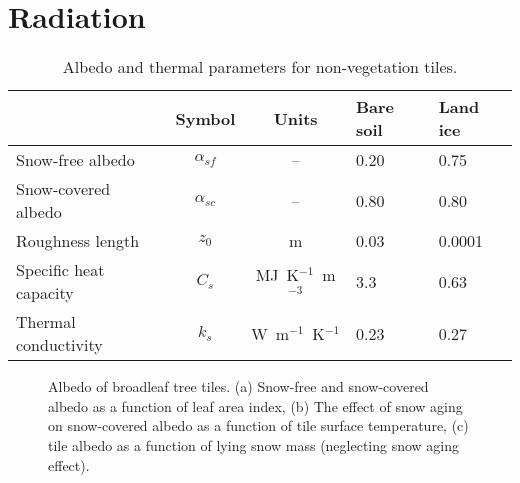 \documentclass[a4paper]{article}
\begin{document}
\section{Radiation}\label{s:radia}
\begin{table}[b]
\begin{center}
\begin{tabular}{lccll}\hline
                       & Symbol        & Units                & Bare soil & Land ice \\ \hline
Snow-free albedo       & $\alpha_{sf}$ & --                   & 0.20      & 0.75 \\
Snow-covered albedo    & $\alpha_{sc}$ & --                   & 0.80      & 0.80 \\
Roughness length       & $z_0$         & m                    & 0.03      & 0.0001 \\
Specific heat capacity & $C_s$         & MJ~K$^{-1}$~m$^{-3}$ & 3.3       & 0.63 \\
Thermal conductivity   & $k_s$         & W~m$^{-1}$~K$^{-1}$  & 0.23      & 0.27 \\ \hline
\end{tabular}
\caption{Albedo and thermal parameters for non-vegetation
tiles.}\label{t:nonveg}
\end{center}
\end{table}

\begin{figure}
\begin{center}
\caption{Albedo of broadleaf tree tiles.  (a)  Snow-free and
  snow-covered albedo as a function of leaf area index, (b) The effect
  of snow aging on snow-covered albedo as a function of tile surface
  temperature, (c) tile albedo as a function of lying snow mass
  (neglecting snow aging effect).}\label{f:alb.bt}
\end{center}
\end{figure}
\end{document}
